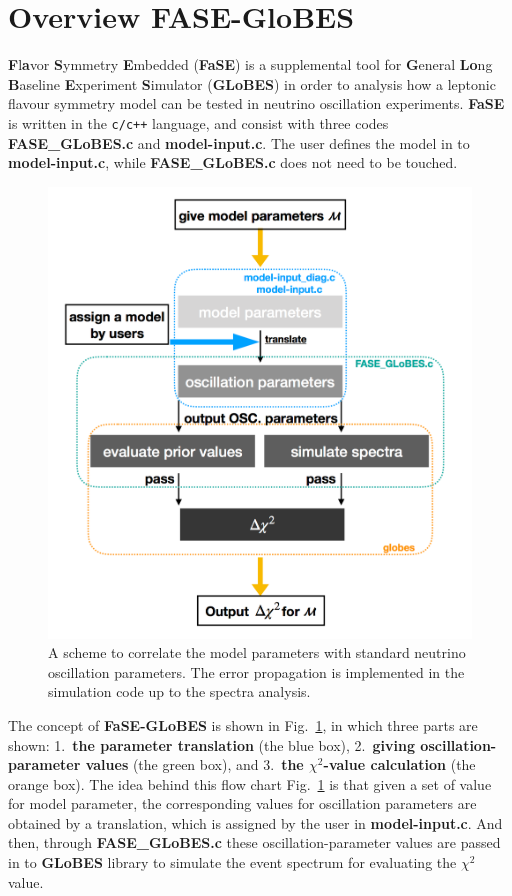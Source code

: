 \documentclass[aps,prd,nofootinbib,preprint]{revtex4}
\begin{document}
\section{Overview FASE-GloBES}

\textbf{F}l\textbf{a}vor \textbf{S}ymmetry \textbf{E}mbedded (\textbf{FaSE}) is a supplemental tool for \textbf{G}eneral \textbf{Lo}ng \textbf{B}aseline \textbf{E}xperiment \textbf{S}imulator (\textbf{GLoBES}) in order to analysis how a leptonic flavour symmetry model can be tested in neutrino oscillation experiments. \textbf{FaSE} is written in the \texttt{c/c++} language, and consist with three codes \textbf{FASE\_GLoBES.c} and \textbf{model-input.c}. The user defines the model in to \textbf{model-input.c}, while \textbf{FASE\_GLoBES.c} does not need to be touched. 

\begin{figure}[!h]%
\centering
\includegraphics[width=4.5in]{Figs/FASE-chart_1_v1.pdf}
\caption{A scheme to correlate the model parameters with standard neutrino oscillation parameters. The error propagation is implemented in the simulation code up to the spectra analysis.}%
\label{fig:FASE}
\end{figure}


The concept of \textbf{FaSE-GLoBES} is shown in Fig.~\ref{fig:FASE}, in which three parts are shown: 1.~\textbf{the parameter translation} (the blue box), 2.~\textbf{giving oscillation-parameter values} (the green box), and 3.~\textbf{the $\chi^2$-value calculation} (the orange box). 
The idea behind this flow chart Fig.~\ref{fig:FASE} is that given a set of value for model parameter, the corresponding values for oscillation parameters are obtained by a translation, which is assigned by the user in \textbf{model-input.c}. And then, through \textbf{FASE\_GLoBES.c} these oscillation-parameter values are passed in to \textbf{GLoBES} library to simulate the event spectrum for evaluating the $\chi^2$ value. 
\end{document}
